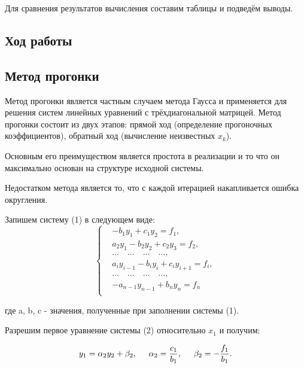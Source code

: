 \documentclass[a4paper,12pt]{article}
\begin{document}
Для сравнения результатов вычисления составим таблицы и подведём выводы.
\newpage

\begin{center}
\section{Ход работы}
\end{center}
\subsection{Метод прогонки}

Метод прогонки является частным случаем метода Гаусса и применяется
для решения систем линейных уравнений с трёхдиагональной матрицей. 
Метод прогонки состоит из двух этапов: прямой ход (определение прогоночных коэффициентов), обратный ход (вычисление неизвестных $x_k$).

Основным его преимуществом является простота в реализации и то что он максимально основан на структуре исходной системы.

Недостатком метода является то, что с каждой итерацией накапливается ошибка округления.

Запишем систему (1) в следующем виде:
\begin{equation}
  \begin{cases}
      &-b_1 y_1 + c_1 y_2 = f_1,\\
      &a_2 y_1 - b_2 y_2 + c_2 y_3 = f_2,\\
      &\dots \quad \dots \quad \dots \quad \dots,\\
      &a_i y_{i-1} - b_i y_i + c_i y_{i+1} = f_i,\\
      &\dots \quad \dots \quad \dots \quad \dots,\\
      &-a_{n-1} y_{n-1} + b_n y_n = f_n\\
  \end{cases}
\end{equation}

где a, b, c - значения, полученные при заполнении системы (1).

Разрешим первое уравнение системы (2) относительно $x_1$ и получим:

\begin{equation*}
  y_1 = \alpha_2 y_2 + \beta_2, \hspace{0.5cm} \alpha_2 = \frac{c_1}{b_1}, \hspace{0.5cm} \beta_2 = -\frac{f_1}{b_1}.
\end{equation*}
\end{document}

